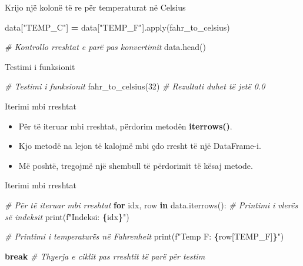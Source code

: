 \documentclass[
  ignorenonframetext,
]{beamer}
\newenvironment{Shaded}{\begin{snugshade}}{\end{snugshade}}
\newcommand{\BuiltInTok}[1]{#1}
\newcommand{\CommentTok}[1]{\textcolor[rgb]{0.56,0.35,0.01}{\textit{#1}}}
\newcommand{\ControlFlowTok}[1]{\textcolor[rgb]{0.13,0.29,0.53}{\textbf{#1}}}
\newcommand{\DecValTok}[1]{\textcolor[rgb]{0.00,0.00,0.81}{#1}}
\newcommand{\KeywordTok}[1]{\textcolor[rgb]{0.13,0.29,0.53}{\textbf{#1}}}
\newcommand{\NormalTok}[1]{#1}
\newcommand{\OperatorTok}[1]{\textcolor[rgb]{0.81,0.36,0.00}{\textbf{#1}}}
\newcommand{\SpecialCharTok}[1]{\textcolor[rgb]{0.81,0.36,0.00}{\textbf{#1}}}
\newcommand{\SpecialStringTok}[1]{\textcolor[rgb]{0.31,0.60,0.02}{#1}}
\newcommand{\StringTok}[1]{\textcolor[rgb]{0.31,0.60,0.02}{#1}}
\begin{document}
\begin{frame}[fragile]{Krijo një kolonë të re për temperaturat në
Celsius}
\protect\hypertarget{krijo-njuxeb-kolonuxeb-tuxeb-re-puxebr-temperaturat-nuxeb-celsius}{}
\begin{Shaded}
\begin{Highlighting}[]
\NormalTok{data[}\StringTok{"TEMP\_C"}\NormalTok{] }\OperatorTok{=}\NormalTok{ data[}\StringTok{"TEMP\_F"}\NormalTok{].}\BuiltInTok{apply}\NormalTok{(fahr\_to\_celsius)}

\CommentTok{\# Kontrollo rreshtat e parë pas konvertimit}
\NormalTok{data.head()}
\end{Highlighting}
\end{Shaded}
\end{frame}

\begin{frame}[fragile]{Testimi i funksionit}
\protect\hypertarget{testimi-i-funksionit}{}
\begin{Shaded}
\begin{Highlighting}[]
\CommentTok{\# Testimi i funksionit}
\NormalTok{fahr\_to\_celsius(}\DecValTok{32}\NormalTok{)  }\CommentTok{\# Rezultati duhet të jetë 0.0}
\end{Highlighting}
\end{Shaded}
\end{frame}

\begin{frame}{Iterimi mbi rreshtat}
\protect\hypertarget{iterimi-mbi-rreshtat}{}
\begin{itemize}
\item
  Për të iteruar mbi rreshtat, përdorim metodën \textbf{iterrows()}.
\item
  Kjo metodë na lejon të kalojmë mbi çdo rresht të një DataFrame-i.
\item
  Më poshtë, tregojmë një shembull të përdorimit të kësaj metode.
\end{itemize}
\end{frame}

\begin{frame}[fragile]{Iterimi mbi rreshtat}
\protect\hypertarget{iterimi-mbi-rreshtat-1}{}
\begin{Shaded}
\begin{Highlighting}[]
\CommentTok{\# Për të iteruar mbi rreshtat}
\ControlFlowTok{for}\NormalTok{ idx, row }\KeywordTok{in}\NormalTok{ data.iterrows():}
    \CommentTok{\# Printimi i vlerës së indeksit}
    \BuiltInTok{print}\NormalTok{(}\SpecialStringTok{f"Indeksi: }\SpecialCharTok{\{}\NormalTok{idx}\SpecialCharTok{\}}\SpecialStringTok{"}\NormalTok{)}

    \CommentTok{\# Printimi i temperaturës në Fahrenheit}
    \BuiltInTok{print}\NormalTok{(}\SpecialStringTok{f"Temp F: }\SpecialCharTok{\{}\NormalTok{row[}\StringTok{\textquotesingle{}TEMP\_F\textquotesingle{}}\NormalTok{]}\SpecialCharTok{\}}\SpecialStringTok{"}\NormalTok{)}

    \ControlFlowTok{break}  \CommentTok{\# Thyerja e ciklit pas rreshtit të parë për testim}
\end{Highlighting}
\end{Shaded}
\end{frame}
\end{document}
